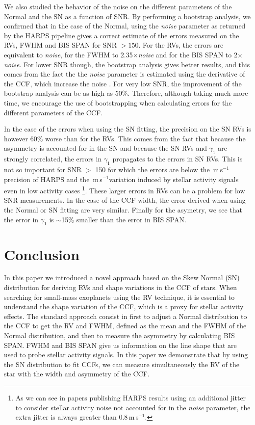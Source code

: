 \documentclass[11pt, oneside]{article}
\def\ms{\hbox{\,m\,s$^{-1}$}}         %
\begin{document}
We also studied the behavior of the noise on the different parameters of the Normal and the SN as a function of SNR. By performing a bootstrap analysis, we confirmed that in the case of the Normal, using the \emph{noise} parameter as returned by the HARPS pipeline gives a correct estimate of the errors measured on the RVs, FWHM and BIS SPAN for SNR $>150$. For the RVs, the errors are equivalent to \emph{noise}, for the FWHM to 2.35$\times$\emph{noise} and for the BIS SPAN to 2$\times$\emph{noise}. For lower SNR though, the bootstrap analysis gives better results, and this comes from the fact the the \emph{noise} parameter is estimated using the derivative of the CCF, which increase the noise \citep[][]{Bouchy-2001b}. For very low SNR, the improvement of the bootstrap analysis can be as high as 50\%. Therefore, although taking much more time, we encourage the use of bootstrapping when calculating errors for the different parameters of the CCF.

In the case of the errors when using the SN fitting, the precision on the SN RVs is however 60\% worse than for the RVs. This comes from the fact that because the asymmetry is accounted for in the SN and because the SN RVs and $\gamma_1$ are strongly correlated, the errors in $\gamma_1$ propagates to the errors in SN RVs. This is not so important for SNR $>$ 150 for which the errors are below the \ms precision of HARPS and the \ms variation induced by stellar activity signals even in low activity cases \footnote{As we can see in papers publishing HARPS results using an additional jitter to consider stellar activity noise not accounted for in the \emph{noise} parameter, the extra jitter is always greater than 0.8\ms \citep[e.g.][]{Diaz:2016ab}.}. These larger errors in RVs can be a problem for low SNR measurements. In the case of the CCF width, the error derived when using the Normal or SN fitting are very similar. Finally for the asymetry, we see that the error in $\gamma_1$ is $\sim$15\% smaller than the error in BIS SPAN.


\section{Conclusion} \label{sec:conclu}

In this paper we introduced a novel approach based on the Skew Normal (SN) distribution for deriving RVs and shape variations in the CCF of stars. When searching for small-mass exoplanets using the RV technique, it is essential to understand the shape variation of the CCF, which is a proxy for stellar activity effects. The standard approach consist in first to adjust a Normal distribution to the CCF to get the RV and FWHM, defined as the mean and the FWHM of the Normal distribution, and then to measure the asymmetry by calculating BIS SPAN. FWHM and BIS SPAN give us information on the line shape that are used to probe stellar activity signals. In this paper we demonstrate that by using the SN distribution to fit CCFs, we can measure simultaneously the RV of the star with the width and asymmetry of the CCF.
\end{document}
